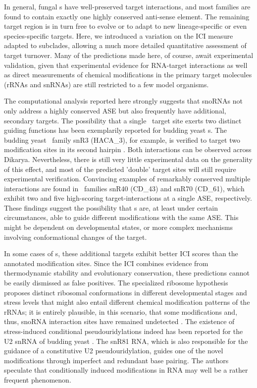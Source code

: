 In general, fungal \sno s have well-preserved target interactions, and
most families are found to contain exactly one highly conserved
anti-sense element. The remaining target region is in turn free to
evolve or to adapt to new lineage-specific or even species-specific
targets. Here, we introduced a variation on the ICI measure adapted to
subclades, allowing a much more detailed quantitative assessment of
target turnover. Many of the predictions made here, of course, await
experimental validation, given that experimental evidence for
RNA-target interactions as well as direct measurements of chemical
modifications in the primary target molecules (rRNAs and snRNAs) are
still restricted to a few model organisms.

The computational analysis reported here strongly suggests that snoRNAs not
only address a highly conserved ASE but also frequently have additional,
secondary targets. The possibility that a single \sno\ target site exerts
two distinct guiding functions has been exemplarily reported for budding
yeast \haca s. The budding yeast \sno\ family snR3 (HACA\_3), for example,
is verified to target two modification sites in its second hairpin
\cite{Schattner:2004}.  Both interactions can be observed across Dikarya.
Nevertheless, there is still very little experimental data on the
generality of this effect, and most of the predicted 'double' target sites
will still require experimental verification. Convincing examples of
remarkably conserved multiple interactions are found in \cd\ families snR40
(CD\_43) and snR70 (CD\_61), which exhibit two and five high-scoring
target-interactions at a single ASE, respectively.  These findings suggest
the possibility that \sno s are, at least under certain circumstances, able
to guide different modifications with the same ASE. This might be dependent
on developmental states, or more complex mechanisms involving
conformational changes of the target.

In some cases of \haca s, these additional targets exhibit better ICI
scores than the annotated modification sites. Since the ICI combines
evidence from thermodynamic stability and evolutionary conservation, these
predictions cannot be easily dismissed as false positives. The specialized
ribosome hypothesis proposes distinct ribosomal conformations in different
developmental stages and stress levels that might also entail different
chemical modification patterns of the rRNAs; it is entirely plausible, in
this scenario, that some modifications and, thus, snoRNA interaction sites
have remained undetected \citep{Xue:2012}. The existence of stress-induced
conditional pseudouridylations indeed has been reported for the U2
snRNA of budding yeast \cite{Wu:2011}. The snR81 RNA, which is also
responsible for the guidance of a constitutive U2 pseudouridylation, guides
one of the novel modifications through imperfect and redundant base
pairing. The authors speculate that conditionally induced modifications in
RNA may well be a rather frequent phenomenon.

